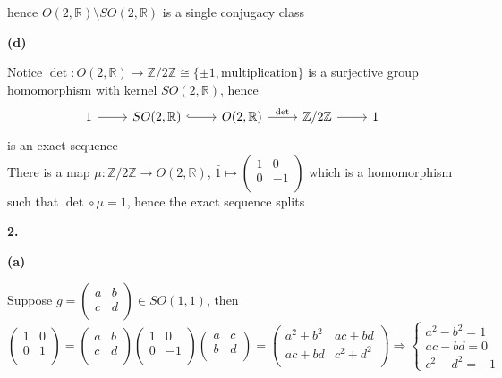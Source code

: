\documentclass[10pt]{article}
\newcommand{\<}[1]{\langle #1 \rangle}
\begin{document}
hence $O(2,\mathbb{R})\setminus SO(2,\mathbb{R})$ is a single conjugacy class \par
\textbf{(d)} \par
Notice $\det:O(2,\mathbb{R})\rightarrow\mathbb{Z}/2\mathbb{Z}\cong\{\pm1,\text{multiplication}\}$ is a surjective group homomorphism with kernel $SO(2,\mathbb{R})$, hence
$$\begin{tikzcd}
1 \arrow[r] & {SO(2,\mathbb{R})} \arrow[r, hook] & {O(2,\mathbb{R})} \arrow[r, "\det"] & \mathbb{Z}/2\mathbb{Z} \arrow[r] & 1
\end{tikzcd}$$
is an exact sequence \\
There is a map $\mu:\mathbb{Z}/2\mathbb{Z}\rightarrow O(2,\mathbb{R})$, $\bar 1\mapsto\left( {\begin{array}{cc}
   1 & 0 \\
   0 & -1 \\
  \end{array} } \right)$ which is a homomorphism such that $\det\circ\mu=1$, hence the exact sequence splits \par
\textbf{2.} \par
\textbf{(a)} \par
Suppose $g=\left( {\begin{array}{cc}
   a & b \\
   c & d \\
  \end{array} } \right) \in SO(1,1)$, then 
  $$\left( {\begin{array}{cc}
   1 & 0 \\
   0 & 1 \\
  \end{array} } \right)=\left( {\begin{array}{cc}
   a & b \\
   c & d \\
  \end{array} } \right)\left( {\begin{array}{cc}
   1 & 0 \\
   0 & -1 \\
  \end{array} } \right)\left( {\begin{array}{cc}
   a & c \\
   b & d \\
  \end{array} } \right)=\left( {\begin{array}{cc}
   a^2+b^2 & ac+bd \\
   ac+bd & c^2+d^2 \\
  \end{array} } \right)\Rightarrow \begin{cases}
  a^2-b^2=1 \\
  ac-bd=0 \\
  c^2-d^2=-1
  \end{cases}$$
\end{document}
